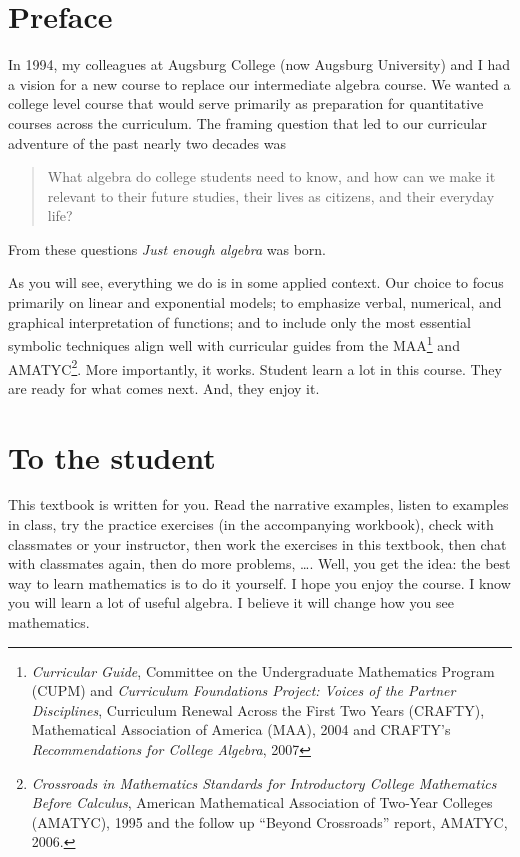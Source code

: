 \section*{Preface}

In 1994, my colleagues at Augsburg College (now Augsburg University) and I had a vision for a new course to replace our intermediate algebra course.  We wanted a college level course that would serve primarily as preparation for quantitative courses across the curriculum. The framing question that led to our curricular adventure of the past nearly two decades was 
\begin{quote}  What algebra do college students need to know, and how can we make it relevant to their future studies, their lives as citizens, and their everyday life?
\end{quote}
From these questions \emph{Just enough algebra} was born.  

As you will see, everything we do is in some applied context.  
Our choice to focus primarily on linear and exponential models; to emphasize verbal, numerical, and graphical interpretation of functions; and to include only the most essential symbolic techniques  align well with curricular guides from the MAA\footnote{\emph{Curricular Guide}, Committee on the Undergraduate Mathematics Program (CUPM) and \emph{Curriculum Foundations Project:  Voices of the Partner Disciplines}, Curriculum Renewal Across the First Two Years (CRAFTY), Mathematical Association of America (MAA), 2004 and CRAFTY's \emph{Recommendations for College Algebra}, 2007} 
and AMATYC\footnote{\emph{Crossroads in Mathematics Standards for Introductory College Mathematics Before Calculus}, American Mathematical Association of Two-Year Colleges (AMATYC), 1995 and the follow up ``Beyond Crossroads'' report, AMATYC, 2006.}.
More importantly, it works.  Student learn a lot in this course.  They are ready for what comes next.  And, they enjoy it.


\section*{To the student}
This textbook is written for you.  Read the narrative examples, listen to examples in class, try the practice exercises (in the accompanying workbook), check with classmates or your instructor, then work the exercises in this textbook, then chat with classmates again, then do more problems, \ldots.  Well, you get the idea:  the best way to learn mathematics is to do it yourself.  I hope you enjoy the course.  I know you will learn a lot of useful algebra.  I believe it will change how you see mathematics.

